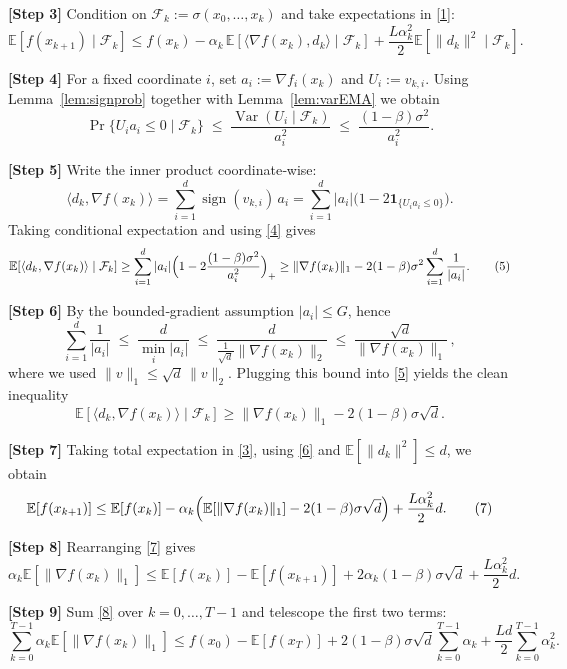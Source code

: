 \documentclass{article}
\newcommand{\sign}{\operatorname{sign}}
\newcommand{\E}{\mathbb{E}}
\begin{document}
\noindent\textbf{[Step 3]} Condition on $\mathcal{F}_{k}:=\sigma(x_{0},\dots,x_{k})$ and take expectations in \eqref{1}:
\[
\E\!\left[f(x_{k+1})\mid\mathcal{F}_{k}\right]
\le f(x_{k})-\alpha_{k}\,\E\!\left[\langle \nabla f(x_{k}),d_{k}\rangle\mid\mathcal{F}_{k}\right]
   +\frac{L\alpha_{k}^{2}}{2}\E\!\left[\|d_{k}\|^{2}\mid\mathcal{F}_{k}\right].
\tag{3}
\]

\noindent\textbf{[Step 4]} For a fixed coordinate $i$, set $a_{i}:=\nabla f_{i}(x_{k})$ and $U_{i}:=v_{k,i}$.  Using Lemma~\ref{lem:signprob} together with Lemma~\ref{lem:varEMA} we obtain
\[
\Pr\{U_{i}a_{i}\le0\mid\mathcal{F}_{k}\}
   \;\le\; \frac{\operatorname{Var}(U_{i}\mid\mathcal{F}_{k})}{a_{i}^{2}}
   \;\le\; \frac{(1-\beta)\sigma^{2}}{a_{i}^{2}} .
\tag{4}
\]

\noindent\textbf{[Step 5]} Write the inner product coordinate‑wise:
\[
\langle d_{k},\nabla f(x_{k})\rangle
   =\sum_{i=1}^{d}\sign(v_{k,i})\,a_{i}
   =\sum_{i=1}^{d}|a_{i}|\bigl(1-2\mathbf{1}_{\{U_{i}a_{i}\le0\}}\bigr).
\]
Taking conditional expectation and using \eqref{4} gives
\[
\E\!\left[\langle d_{k},\nabla f(x_{k})\rangle\mid\mathcal{F}_{k}\right]
   \ge \sum_{i=1}^{d}|a_{i}|\Bigl(1-2\frac{(1-\beta)\sigma^{2}}{a_{i}^{2}}\Bigr)_{+}
   \ge \|\nabla f(x_{k})\|_{1}
        -2(1-\beta)\sigma^{2}\sum_{i=1}^{d}\frac{1}{|a_{i}|}.
\tag{5}
\]

\noindent\textbf{[Step 6]} By the bounded‑gradient assumption $|a_{i}|\le G$, hence
\[
\sum_{i=1}^{d}\frac{1}{|a_{i}|}\;\le\;\frac{d}{\min_{i}|a_{i}|}
   \;\le\;\frac{d}{\frac{1}{\sqrt{d}}\|\nabla f(x_{k})\|_{2}}
   \;\le\;\frac{\sqrt{d}}{\|\nabla f(x_{k})\|_{1}}\,,
\]
where we used $\|v\|_{1}\le\sqrt{d}\,\|v\|_{2}$.
Plugging this bound into \eqref{5} yields the clean inequality
\[
\E\!\left[\langle d_{k},\nabla f(x_{k})\rangle\mid\mathcal{F}_{k}\right]
   \ge \|\nabla f(x_{k})\|_{1}
        -2(1-\beta)\sigma\sqrt{d}.
\tag{6}
\]

\noindent\textbf{[Step 7]} Taking total expectation in \eqref{3}, using \eqref{6} and $\E[\|d_{k}\|^{2}]\le d$, we obtain
\[
\E[f(x_{k+1})]\le \E[f(x_{k})]
   -\alpha_{k}\Bigl(\E[\|\nabla f(x_{k})\|_{1}]
        -2(1-\beta)\sigma\sqrt{d}\Bigr)
   +\frac{L\alpha_{k}^{2}}{2}d .
\tag{7}
\]

\noindent\textbf{[Step 8]} Rearranging \eqref{7} gives
\[
\alpha_{k}\E[\|\nabla f(x_{k})\|_{1}]
   \le \E[f(x_{k})]-\E[f(x_{k+1})]
        +2\alpha_{k}(1-\beta)\sigma\sqrt{d}
        +\frac{L\alpha_{k}^{2}}{2}d .
\tag{8}
\]

\noindent\textbf{[Step 9]} Sum \eqref{8} over $k=0,\dots,T-1$ and telescope the first two terms:
\[
\sum_{k=0}^{T-1}\alpha_{k}\E[\|\nabla f(x_{k})\|_{1}]
   \le f(x_{0})- \E[f(x_{T})]
        +2(1-\beta)\sigma\sqrt{d}\sum_{k=0}^{T-1}\alpha_{k}
        +\frac{L d}{2}\sum_{k=0}^{T-1}\alpha_{k}^{2}.
\tag{9}
\]
\end{document}
